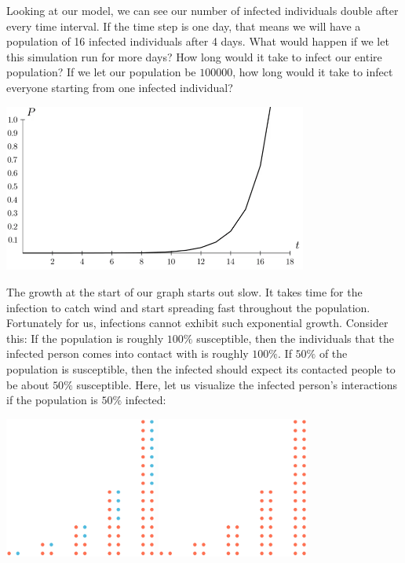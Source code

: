 \documentclass{amsart}
\theoremstyle{definition}
\numberwithin{equation}{section}
\begin{document}
\begin{sansmath}
Looking at our model, we can see our number of infected individuals double after every time interval. If the time step is one day, that means we will have a population of 16 infected individuals after 4 days. What would happen if we let this simulation run for more days? How long would it take to infect our entire population? If we let our population be $100000$, how long would it take to infect everyone starting from one infected individual?

\begin{center}
  \includegraphics[width=10cm]{ExponentialGrowth}
\end{center}

The growth at the start of our graph starts out slow. It takes time for the infection to catch wind and start spreading fast throughout the population. Fortunately for us, infections cannot exhibit such exponential growth. Consider this: If the population is roughly $100\%$ susceptible, then the individuals that the infected person comes into contact with is roughly $100\%$. If $50\%$ of the population is susceptible, then the infected should expect its contacted people to be about $50\%$ susceptible. Here, let us visualize the infected person's interactions if the population is $50\%$ infected:

\begin{center}
  \includegraphics[width=5cm]{DotsLogisticPre}
  \quad
  \includegraphics[width=5cm]{DotsLogisticPost}
\end{center}


\end{sansmath}
\end{document}
